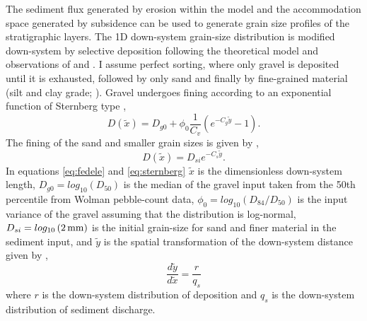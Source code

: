 \begin{subappendices}
The sediment flux generated by erosion within the model and the accommodation space generated by subsidence can be used to generate grain size profiles of the stratigraphic layers. The 1D down-system grain-size distribution is modified down-system by selective deposition following the theoretical model and observations of \cite{fedele-2007} and \cite{duller-etal-2010}. I assume perfect sorting, where only gravel is deposited until it is exhausted, followed by only sand and finally by fine-grained material (silt and clay grade; \citealp{paola-etal-1992}). Gravel undergoes fining according to an exponential function of Sternberg type \citep{fedele-2007,duller-etal-2010},
\begin{equation}
D(\tilde{x}) = D_{g0} + \phi_{0}\frac{1}{C_{v}}\left( e^{-C_{g}\tilde{y}}-1 \right).
\label{eq:fedele}
\end{equation}
The fining of the sand and smaller grain sizes is given by \cite{sternberg-1875},
\begin{equation}
D(\tilde{x}) = D_{si}e^{-C_{s}\tilde{y}}.
\label{eq:sternberg}
\end{equation}
In equations \ref{eq:fedele} and \ref{eq:sternberg} $\tilde{x}$ is the dimensionless down-system length, $D_{g0} = log_{10}\left(D_{50}\right)$ is the median of the gravel input taken from the 50th percentile from Wolman pebble-count data, $\phi_{0} = log_{10}\left( D_{84}/D_{50} \right)$ is the input variance of the gravel assuming that the distribution is log-normal, $D_{si} = log_{10}\left( 2\,{\rm mm} \right)$ is the initial grain-size for sand and finer material in the sediment input, and $\tilde{y}$ is the spatial transformation of the down-system distance given by \citep{paola-1995},
\begin{equation}
\frac{d\tilde{y}}{d\tilde{x}} = \frac{r}{q_{s}}
\end{equation}
where $r$ is the down-system distribution of deposition and $q_{s}$ is the down-system distribution of sediment discharge.

\end{subappendices}
